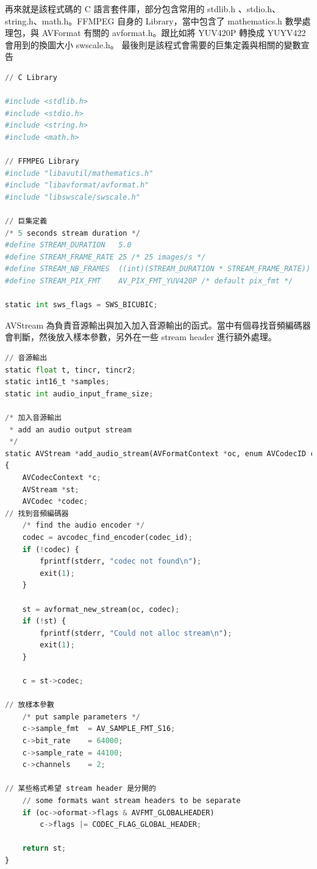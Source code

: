 \documentclass[10pt,UTF8]{ctexart}
\begin{document}
再來就是該程式碼的 C 語言套件庫，部分包含常用的 stdlib.h 、stdio.h、string.h、math.h。FFMPEG 自身的 Library，當中包含了 mathematics.h 數學處理包，與 AVFormat 有關的 avformat.h。跟比如將 YUV420P 轉換成 YUYV422 會用到的換圖大小 swscale.h。
最後則是該程式會需要的巨集定義與相關的變數宣告

\begin{lstlisting}[language={python}]
// C Library

#include <stdlib.h>
#include <stdio.h>
#include <string.h>
#include <math.h>

// FFMPEG Library
#include "libavutil/mathematics.h"
#include "libavformat/avformat.h"
#include "libswscale/swscale.h"

// 巨集定義
/* 5 seconds stream duration */
#define STREAM_DURATION   5.0
#define STREAM_FRAME_RATE 25 /* 25 images/s */
#define STREAM_NB_FRAMES  ((int)(STREAM_DURATION * STREAM_FRAME_RATE))
#define STREAM_PIX_FMT    AV_PIX_FMT_YUV420P /* default pix_fmt */

static int sws_flags = SWS_BICUBIC;
\end{lstlisting}

AVStream 為負責音源輸出與加入加入音源輸出的函式。當中有個尋找音頻編碼器會判斷，然後放入樣本參數，另外在一些 stream header 進行額外處理。

\begin{lstlisting}[language={python}]
// 音源輸出
static float t, tincr, tincr2;
static int16_t *samples;
static int audio_input_frame_size;

/* 加入音源輸出
 * add an audio output stream
 */
static AVStream *add_audio_stream(AVFormatContext *oc, enum AVCodecID codec_id)
{
    AVCodecContext *c;
    AVStream *st;
    AVCodec *codec;
// 找到音頻編碼器
    /* find the audio encoder */
    codec = avcodec_find_encoder(codec_id);
    if (!codec) {
        fprintf(stderr, "codec not found\n");
        exit(1);
    }

    st = avformat_new_stream(oc, codec);
    if (!st) {
        fprintf(stderr, "Could not alloc stream\n");
        exit(1);
    }

    c = st->codec;

// 放樣本參數
    /* put sample parameters */
    c->sample_fmt  = AV_SAMPLE_FMT_S16;
    c->bit_rate    = 64000;
    c->sample_rate = 44100;
    c->channels    = 2;

// 某些格式希望 stream header 是分開的
    // some formats want stream headers to be separate
    if (oc->oformat->flags & AVFMT_GLOBALHEADER)
        c->flags |= CODEC_FLAG_GLOBAL_HEADER;

    return st;
}
\end{lstlisting}
\end{document}
